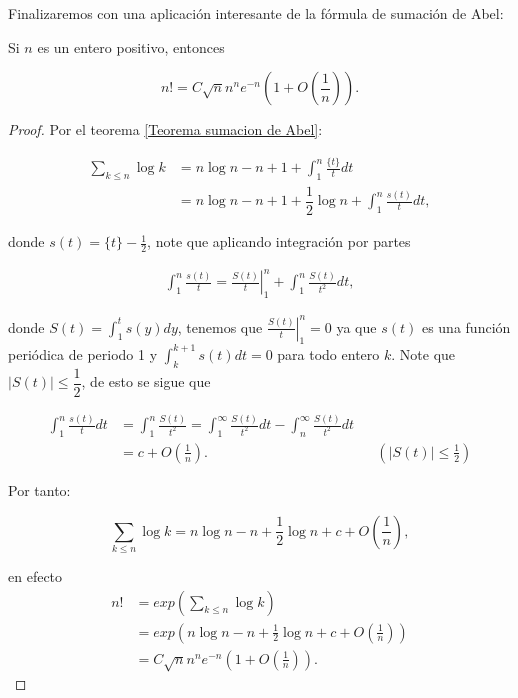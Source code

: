 Finalizaremos con una aplicación interesante de la fórmula de sumación de Abel:

\begin{prop}
Si $n$ es un entero positivo, entonces

$$n!=C \sqrt{n} n^n e^{-n}\left(1+O\left(\frac{1}{n}\right)\right).$$
\end{prop}

\begin{proof}
Por el teorema \ref{Teorema sumacion de Abel}:

\begin{align*}
    \sum_{k\leq n}\log k&=n\log n-n+1+\int_1^n\frac{\{t\}}{t}dt\\
    &=n\log n -n+1+\dfrac{1}{2}\log n+\int_1^n \frac{s(t)}{t}dt,
\end{align*}

donde $s(t)=\{t\}-\frac{1}{2}$, note que aplicando integración por partes

\begin{align*}
\int_1^n \frac{s(t)}{t}=\left.\frac{S(t)}{t}\right|_1 ^n+\int_1^n \frac{S(t)}{t^2} dt,
\end{align*}

donde $S(t)=\displaystyle\int_1^t s(y)dy$, tenemos que $\displaystyle\left.\frac{S(t)}{t}\right|_1 ^n=0$ ya que $s(t)$ es una función periódica de periodo 1 y $\displaystyle\int_k^{k+1}s(t)dt=0$ para todo entero $k$. Note que $|S(t)|\leq \dfrac{1}{2}$, de esto se sigue que

\begin{align*}
\int_1^n \frac{s(t)}{t}dt&=\int_1^n\frac{S(t)}{t^2}=\int_1^{\infty}\frac{S(t)}{t^2}dt-\int_n^{\infty}\frac{S(t)}{t^2}dt\\
&=c+O\left(\frac{1}{n}\right). && \left(|S(t)|\leq \frac{1}{2}\right)
\end{align*}

Por tanto:

$$\sum_{k\leq n}\log k=n \log n-n+\frac{1}{2} \log n+c+O\left(\frac{1}{n}\right),$$

en efecto
\begin{align*}
    n!&=exp{\displaystyle\left(\sum_{k\leq n}\log k\right)}\\
    &=exp{\displaystyle \left(n \log n-n+\frac{1}{2} \log n+c+O\left(\frac{1}{n}\right)\right)}\\
    &=C\sqrt{n}n^ne^{-n}\left(1+O\left(\frac{1}{n}\right)\right)
.\end{align*}

\end{proof}

